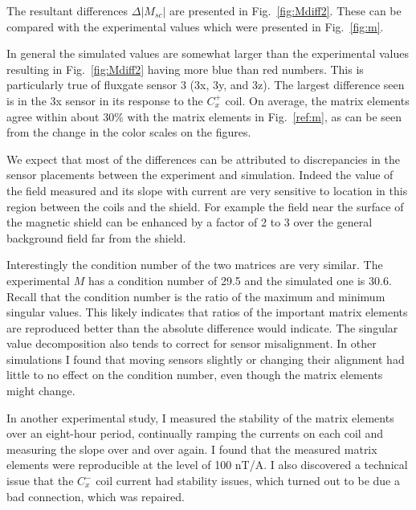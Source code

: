 The resultant differences $\Delta|M_{sc}|$ are presented in
Fig.~\ref{fig:Mdiff2}.  These can be compared with the experimental
values which were presented in Fig.~\ref{fig:m}.

In general the simulated values are somewhat larger than the
experimental values resulting in Fig.~\ref{fig:Mdiff2} having more
blue than red numbers.  This is particularly true of fluxgate sensor 3
(3x, 3y, and 3z).  The largest difference seen is in the 3x sensor in
its response to the $C_x^+$ coil.  On average, the matrix elements
agree within about 30\% with the matrix elements in Fig.~\ref{ref:m},
as can be seen from the change in the color scales on the figures.

We expect that most of the differences can be attributed to
discrepancies in the sensor placements between the experiment and
simulation.  Indeed the value of the field measured and its slope with
current are very sensitive to location in this region between the
coils and the shield.  For example the field near the surface of the
magnetic shield can be enhanced by a factor of 2 to 3 over the general
background field far from the shield.

Interestingly the condition number of the two matrices are very
similar.  The experimental $M$ has a condition number of 29.5 and the
simulated one is 30.6.  Recall that the condition number is the ratio
of the maximum and minimum singular values.  This likely indicates
that ratios of the important matrix elements are reproduced better
than the absolute difference would indicate.  The singular value
decomposition also tends to correct for sensor misalignment.  In other
simulations I found that moving sensors slightly or changing their
alignment had little to no effect on the condition number, even though
the matrix elements might change.

In another experimental study, I measured the stability of the matrix
elements over an eight-hour period, continually ramping the currents
on each coil and measuring the slope over and over again.  I found
that the measured matrix elements were reproducible at the level of
100 nT/A.  I also discovered a technical issue that the $C_x^-$ coil
current had stability issues, which turned out to be due a bad
connection, which was repaired.




